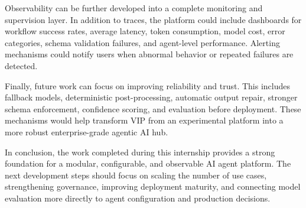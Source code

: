 Observability can be further developed into a complete monitoring and supervision layer. In addition to traces, the platform could include dashboards for workflow success rates, average latency, token consumption, model cost, error categories, schema validation failures, and agent-level performance. Alerting mechanisms could notify users when abnormal behavior or repeated failures are detected.

Finally, future work can focus on improving reliability and trust. This includes fallback models, deterministic post-processing, automatic output repair, stronger schema enforcement, confidence scoring, and evaluation before deployment. These mechanisms would help transform VIP from an experimental platform into a more robust enterprise-grade agentic AI hub.

In conclusion, the work completed during this internship provides a strong foundation for a modular, configurable, and observable AI agent platform. The next development steps should focus on scaling the number of use cases, strengthening governance, improving deployment maturity, and connecting model evaluation more directly to agent configuration and production decisions.

